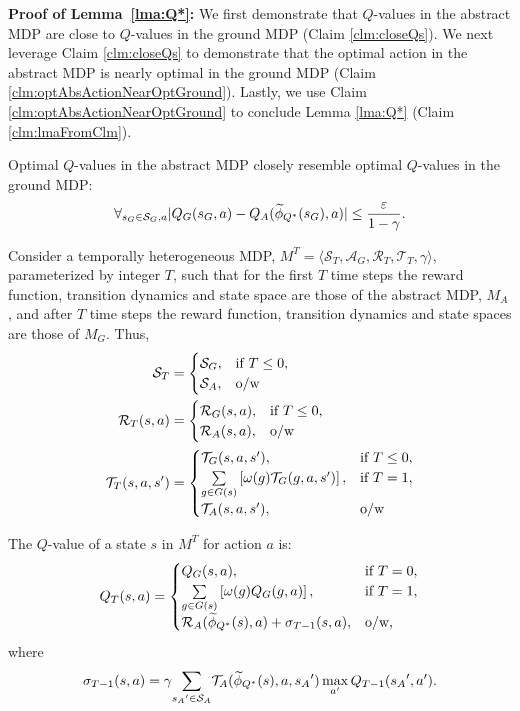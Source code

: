 \textbf{Proof of Lemma~\ref{lma:Q*}:}
We first demonstrate that $Q$-values in the abstract \ac{MDP} are close to $Q$-values in the ground \ac{MDP} (Claim \ref{clm:closeQs}). We next leverage Claim \ref{clm:closeQs} to demonstrate that the optimal action in the abstract \ac{MDP} is nearly optimal in the ground \ac{MDP}  (Claim \ref{clm:optAbsActionNearOptGround}). Lastly, we use Claim \ref{clm:optAbsActionNearOptGround} to conclude Lemma \ref{lma:Q*} (Claim \ref{clm:lmaFromClm}).
\begin{clm}
\label{clm:closeQs}
Optimal $Q$-values in the abstract \ac{MDP} closely resemble optimal $Q$-values in the ground \ac{MDP}:
\begin{equation}
\label{eq:Q*Claim1}
\forall_{s_G \in \mathcal{S}_G, a} |Q_G(s_G, a) - Q_A(\widetilde \phi_{Q^*}(s_G), a)| \leq \frac{\varepsilon}{1-\gamma}.
\end{equation}
\end{clm}

Consider a temporally heterogeneous \ac{MDP}, $M^T = \langle \mathcal{S}_T, \mathcal{A}_G, \mathcal{R}_T, \mathcal{T}_T, \gamma \rangle$, parameterized by integer $T$, such that for the first $T$ time steps the reward function, transition dynamics and state space are those of the abstract MDP, $M_A$, and after $T$ time steps the reward function, transition dynamics and state spaces are those of $M_G$. Thus,
\begin{align*}
\mathcal{S}_T &= \begin{cases}
\mathcal{S}_G,& \text{if } T \leq 0, \\
\mathcal{S}_A,& \text{o/w}
\end{cases}\\
\mathcal{R}_T(s,a) &= \begin{cases}
\mathcal{R}_G(s,a),& \text{if } T \leq 0, \\
\mathcal{R}_A(s, a),& \text{o/w}
\end{cases}\\
\mathcal{T}_T(s,a,s') &= \begin{cases}
\mathcal{T}_G(s,a,s'),& \text{if }T \leq 0, \\
\underset{{g \in G(s)}}{\sum}\left[\omega(g)\mathcal{T}_G(g, a, s')\right],& \text{if } T = 1, \\
\mathcal{T}_A(s,a,s'),& \text{o/w}
\end{cases}\\
\end{align*}

The $Q$-value of a state $s$ in $M^T$ for action $a$ is:
\begin{equation}
Q_T(s, a) = 
\begin{cases}
	   Q_G(s, a), &  \text{if } T=0,\\
	   \underset{g \in G(s)}{\sum} \left[ \omega(g)Q_G(g,a) \right], & \text{if } T = 1,\\
	   \mathcal{R}_A(\widetilde \phi_{Q^*}(s),a) + \sigma_{T-1}(s,a), &\text{o/w},
\end{cases}
\end{equation}
where
\begin{equation*}
\sigma_{T-1}(s,a) = \gamma \underset{{s_A}' \in \mathcal{S}_A}{\sum} \mathcal{T}_A(\widetilde \phi_{Q^*}(s),a,{s_A}') \max_{a'} Q_{T-1}({s_A}', a').
\end{equation*}

